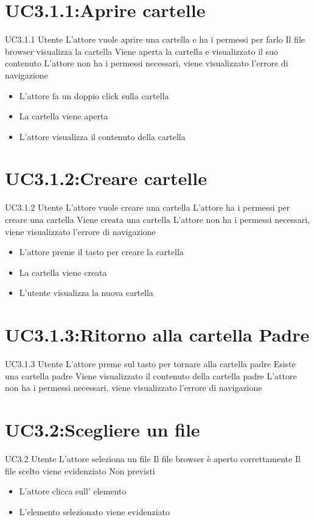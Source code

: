 \documentclass[../AnalisideiRequisiti.tex]{subfiles}
\begin{document}
	\section{UC3.1.1:Aprire cartelle}
	\UserCase
	{UC3.1.1}
	{Utente}
	{}
	{L'attore vuole aprire una cartella e ha i permessi per farlo}
	{Il file browser visualizza la cartella}
	{Viene aperta la cartella e visualizzato il suo contenuto}
	{L'attore non ha i permessi necessari, viene visualizzato l'errore di navigazione }
	{
		\begin{itemize}
			\item{} L'attore fa un doppio click sulla cartella
			\item{} La cartella viene aperta
			\item{} L'attore visualizza il contenuto della cartella
		\end{itemize}
	}
	\section{UC3.1.2:Creare cartelle}
	\UserCase
	{UC3.1.2}
	{Utente}
	{}
	{L'attore vuole creare una cartella}
	{L'attore ha i permessi per creare una cartella}
	{Viene creata una cartella}
	{L'attore non ha i permessi necessari, viene visualizzato l'errore di navigazione }
	{
		\begin{itemize}
		\item{} L'attore preme il tasto per creare la cartella
		\item{} La cartella viene creata
		\item{} L'utente visualizza la nuova cartella
		\end{itemize}
	}

	\section{UC3.1.3:Ritorno alla cartella Padre}
\UserCase
{UC3.1.3}
{Utente}
{}
{L'attore preme sul tasto per tornare alla cartella padre}
{Esiste una cartella padre}
{Viene visualizzato il contenuto della cartella padre}
{L'attore non ha i permessi necessari, viene visualizzato l'errore di navigazione }
{}
	\section{UC3.2:Scegliere un file}
\UserCase
{UC3.2}
{Utente}
{}
{L'attore seleziona un file}
{Il file browser è aperto correttamente}
{Il file scelto viene evidenziato}
{Non previsti}
{
	\begin{itemize}
		\item{} L'attore clicca sull' elemento
		\item{} L'elemento selezionato viene evidenziato
	\end{itemize}
}
\end{document}
